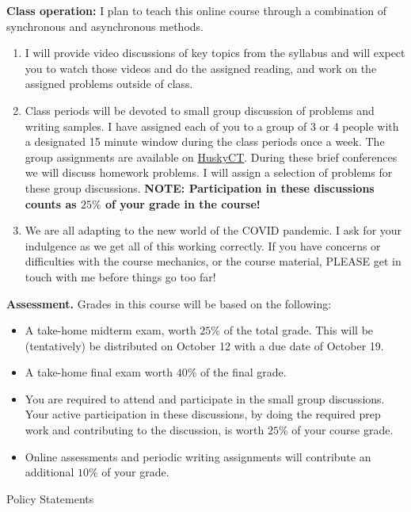 \documentclass[12pt]{article}
\begin{document}
{\bf Class operation:} I plan to teach this online course through a combination of synchronous and asynchronous
methods.
\begin{enumerate}
  \item I will provide video discussions of key topics from the syllabus and will expect you to watch those
    videos and do the assigned reading, and work on the assigned problems outside of class.
  \item Class periods will be devoted to small group discussion of problems
    and writing samples.  I have assigned each of you to a group of 3 or 4 people with a designated
    15 minute window during the class periods once a week.  The group assignments are available
    on \href{http://huckyct.uconn.edu}{HuskyCT}.  During these brief conferences we will discuss
    homework problems.  I will assign a selection of problems for these group discussions.
    {\bf NOTE: Participation in these discussions counts as $25\%$ of your grade in the course!}
  \item We are all adapting to the new world of the COVID pandemic.  I ask for your indulgence
    as we get all of this working correctly.  If you have concerns or difficulties with the course
    mechanics, or the course material, PLEASE get in touch with me before things go too far!
\end{enumerate}

{\bf Assessment.}  Grades in this course will be based on the
following:
\begin{itemize}
\item A take-home midterm exam,  worth $25\%$ of the total grade.  This will be (tentatively)
  be distributed on October 12 with a due date of October 19.
\item A take-home final exam worth $40\%$ of the final grade.
\item You are required to attend and participate in the small group discussions.  Your active participation
  in these discussions, by doing the required prep work and contributing to the discussion, is worth
  $25\%$ of your course grade.
\item Online assessments and periodic writing assignments will contribute an additional $10\%$ of your grade.
\end{itemize}



\begin{center}

{\Large Policy Statements}

\end{center}
\end{document}
